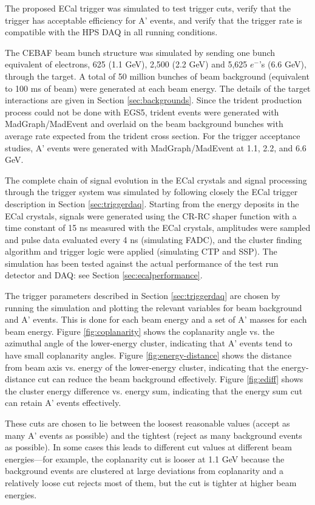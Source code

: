 The proposed ECal trigger was simulated to test trigger cuts, verify
that the trigger has acceptable efficiency for A' events, and verify 
that the trigger rate is compatible with the HPS DAQ in all running conditions. 

The CEBAF beam bunch structure was simulated by sending one bunch 
equivalent of electrons, 
625 (1.1 GeV), 2,500 (2.2 GeV) and 5,625 $e^-$'s (6.6 GeV), through 
the target. A total of 50 million bunches of beam background 
(equivalent to 100 ms of beam) were 
generated at each beam energy. The details of the target interactions are given in Section \ref{sec:backgrounds}.
Since the trident production process 
could not be done with EGS5, trident events were generated with MadGraph/MadEvent 
and overlaid on the beam background bunches with average rate 
expected from the trident cross section.
For the trigger acceptance studies, A' events were generated with 
MadGraph/MadEvent at 1.1, 2.2, and 6.6 GeV.

The complete chain of signal evolution in the ECal crystals and 
signal processing through the trigger system was simulated
by following closely the ECal trigger description in Section \ref{sec:triggerdaq}. 
Starting from the energy deposits in the ECal crystals, signals were 
generated using the CR-RC shaper function with a time constant of 15 ns
measured with the ECal crystals, amplitudes were sampled and pulse data 
evaluated every 4 ns (simulating FADC), and the cluster 
finding algorithm and trigger logic were applied (simulating CTP and SSP). 
The simulation has been tested against the actual performance of the test run detector and DAQ: see Section \ref{sec:ecalperformance}.

The trigger parameters described in Section \ref{sec:triggerdaq} are 
chosen by running the simulation and plotting the relevant variables 
for beam background and A' events. This is done for each beam energy 
and a set of A' masses for each beam energy. 
Figure \ref{fig:coplanarity} shows the coplanarity angle vs. the azimuthal 
angle of the lower-energy cluster, indicating that A' events 
tend to have small coplanarity angles. Figure \ref{fig:energy-distance} shows
the distance from beam axis vs. energy of the lower-energy cluster,
indicating that the energy-distance cut can reduce the beam background effectively.
Figure \ref{fig:ediff} shows the cluster energy difference vs. energy sum,
indicating that the energy sum cut can retain A' events effectively.       


These cuts are chosen to lie between the loosest reasonable values (accept as many A' events as possible) and the tightest (reject as many background events as possible). In some cases this leads to different cut values at different beam energies---for example, the coplanarity cut is looser at 1.1 GeV because the background events are clustered at large deviations from coplanarity and a relatively loose cut rejects most of them, but the cut is tighter at higher beam energies.

